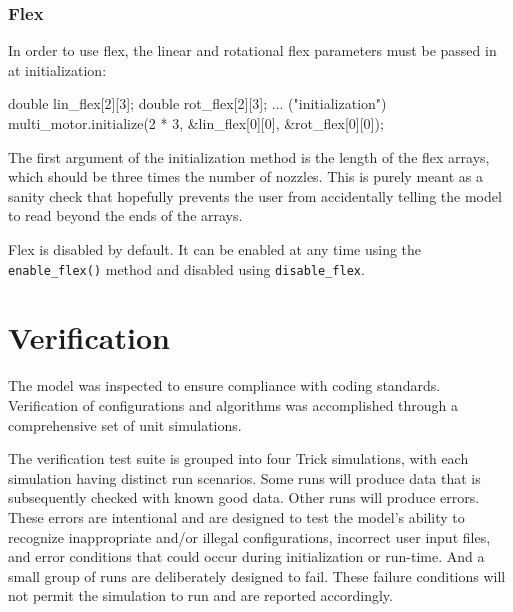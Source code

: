 \documentclass[11pt,fleqn]{report}
\begin{document}
\subsection{Flex}
\par In order to use flex, the linear and rotational flex parameters must be passed in at initialization:
\begin{code}
  double lin_flex[2][3];
  double rot_flex[2][3];
...  
    ("initialization") multi_motor.initialize(2 * 3,
                                              &lin_flex[0][0],
                                              &rot_flex[0][0]);
\end{code}
The first argument of the initialization method is the length of the flex arrays, which should be three times the number of nozzles. This is purely meant as a sanity check that hopefully prevents the user from accidentally telling the model to read beyond the ends of the arrays.
\par Flex is disabled by default. It can be enabled at any time using the \verb|enable_flex()| method and disabled using \verb|disable_flex|.

\chapter{Verification} 

The model was inspected to ensure compliance with coding standards.  Verification of configurations and algorithms was accomplished through a comprehensive set of unit simulations.  

The verification test suite is grouped into four Trick simulations, with each simulation having distinct run scenarios.  Some runs will produce data that is subsequently checked with known good data.  Other runs will produce errors.  These errors are intentional and are designed to test the model's ability to recognize inappropriate and/or illegal configurations, incorrect user input files, and error conditions that could occur during initialization or run-time.  And a small group of runs are deliberately designed to fail.  These failure conditions will not permit the simulation to run and are reported accordingly.
\end{document}
